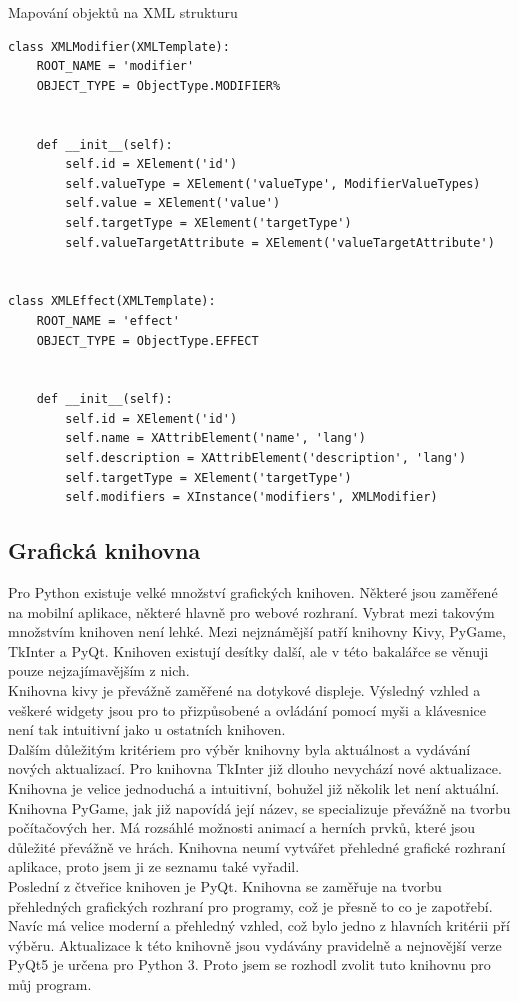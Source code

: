 \documentclass[thesis=B,czech]{resources/FITthesis}[2012/06/26]
\begin{document}
\begin{listing}[htbp]
\caption{\label{code:XMLTemplates}Mapování objektů na XML strukturu}
\begin{verbatim}
class XMLModifier(XMLTemplate):
    ROOT_NAME = 'modifier'
    OBJECT_TYPE = ObjectType.MODIFIER%


    def __init__(self):
        self.id = XElement('id')
        self.valueType = XElement('valueType', ModifierValueTypes)
        self.value = XElement('value')
        self.targetType = XElement('targetType')
        self.valueTargetAttribute = XElement('valueTargetAttribute')


class XMLEffect(XMLTemplate):
    ROOT_NAME = 'effect'
    OBJECT_TYPE = ObjectType.EFFECT


    def __init__(self):
        self.id = XElement('id')
        self.name = XAttribElement('name', 'lang')
        self.description = XAttribElement('description', 'lang')
        self.targetType = XElement('targetType')
        self.modifiers = XInstance('modifiers', XMLModifier)
\end{verbatim}
\end{listing}

\subsection{Grafická knihovna}
Pro Python existuje velké množství grafických knihoven. Některé jsou zaměřené na mobilní aplikace, některé hlavně pro webové rozhraní. Vybrat mezi takovým množstvím knihoven není lehké. Mezi nejznámější patří knihovny Kivy, PyGame, TkInter a PyQt. Knihoven existují desítky další, ale v této bakalářce se věnuji pouze nejzajímavějším z nich.\\
Knihovna kivy je převážně zaměřené na dotykové displeje. Výsledný vzhled a veškeré widgety jsou pro to přizpůsobené a ovládání pomocí myši a klávesnice není tak intuitivní jako u ostatních knihoven.\\
Dalším důležitým kritériem pro výběr knihovny byla aktuálnost a vydávání nových aktualizací. Pro knihovna TkInter již dlouho nevychází nové aktualizace. Knihovna je velice jednoduchá a intuitivní, bohužel již několik let není aktuální. \\
Knihovna PyGame, jak již napovídá její název, se specializuje převážně na tvorbu počítačových her. Má rozsáhlé možnosti animací a herních prvků, které jsou důležité převážně ve hrách. Knihovna neumí vytvářet přehledné grafické rozhraní aplikace, proto jsem ji ze seznamu také vyřadil.\\
Poslední z čtveřice knihoven je PyQt. Knihovna se zaměřuje na tvorbu přehledných grafických rozhraní pro programy, což je přesně to co je zapotřebí. Navíc má velice moderní a přehledný vzhled, což bylo jedno z hlavních kritérii pří výběru. Aktualizace k této knihovně jsou vydávány pravidelně a nejnovější verze PyQt5 je určena pro Python 3. Proto jsem se rozhodl zvolit tuto knihovnu pro můj program.
\end{document}
